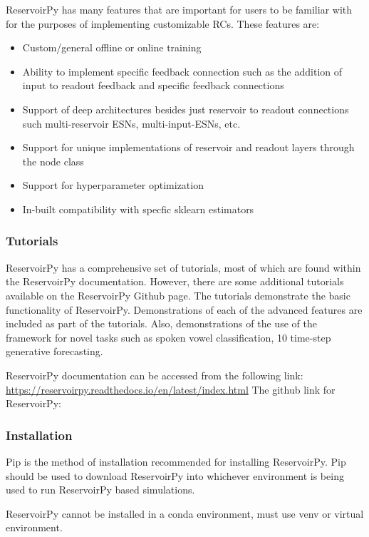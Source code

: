 \documentclass[a4paper,fleqn]{cas-dc}
\begin{document}
ReservoirPy has many features that are important for users to be familiar with for the purposes of implementing customizable RCs. These features are:
\begin{itemize}
  \item Custom/general offline or online training
  \item Ability to implement specific feedback connection such as the addition of input to readout feedback and specific feedback connections
  \item Support of deep architectures besides just reservoir to readout connections such multi-reservoir ESNs, multi-input-ESNs, etc.
  \item Support for unique implementations of reservoir and readout layers through the node class
  \item Support for hyperparameter optimization 
  \item In-built compatibility with specfic sklearn estimators
\end{itemize}

\subsubsection{Tutorials}
ReservoirPy has a comprehensive set of  tutorials, most of which are found within the ReservoirPy documentation. However, there are some additional tutorials available on the ReservoirPy Github page. The tutorials demonstrate the basic functionality of ReservoirPy. Demonstrations of each of the advanced features are included as part of the tutorials. Also, demonstrations of the use of the framework for novel tasks such as spoken vowel classification, 10 time-step generative forecasting.




ReservoirPy documentation can be accessed from the following link: \url{https://reservoirpy.readthedocs.io/en/latest/index.html}
The github link for ReservoirPy: 

\subsubsection{Installation}
Pip is the method of installation recommended for installing ReservoirPy. Pip should be used to download ReservoirPy into whichever environment is being used to run ReservoirPy based simulations.

ReservoirPy cannot be installed in a conda environment, must use venv or virtual environment.
\end{document}
